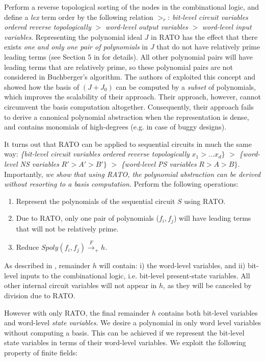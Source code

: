 Perform a reverse topological sorting of the nodes in the
combinational logic, and define a {\it lex} term order by the
following relation $>_{r}$: {\it bit-level circuit variables ordered
  reverse topologically} $>$  {\it word-level output variables} $>$
{\it word-level input   variables}. Representing the polynomial ideal
$J$ in RATO has the effect that there exists {\it one and only one
  pair of polynomials} in $J$ that do not have relatively prime
leading terms (see  Section 5 in \cite{pruss:dac14} for details). All
other polynomial pairs will have leading terms that are 
relatively prime, so these polynomial pairs are not considered in
Buchberger's algorithm.  The authors of \cite{pruss:dac14} exploited
this concept and showed how the \Grobner basis of $(J + J_0)$ can be
computed by a {\it subset} of polynomials, which  improves the
scalability of their approach. Their approach, however, cannot
circumvent the \Grobner basis computation altogether. Consequently, 
their approach fails to derive a canonical polynomial abstraction when
the representation is dense, and contains monomials of high-degrees
(e.g. in case of buggy designs). 

It turns out that RATO can be applied to sequential circuits in much
the same way: {\it \{bit-level circuit variables ordered
  reverse topologically} $x_1 > \dots x_d\}$ $>$  {\it \{word-level NS
  variables} $R'> A'> B'\}$ $>$ {\it \{word-level PS variables}
$R>A>B\}$. Importantly, {\it we show that using RATO, the polynomial
abstraction can be derived without resorting to a \Grobner basis
computation.} Perform the following operations: 

\begin{enumerate}
\item Represent the polynomials of the sequential circuit $S$ using RATO.
\item Due to RATO, only one pair of polynomials ($f_i, f_j$) will have
  leading terms that will not be relatively prime.
\item Reduce $Spoly(f_i, f_j) \xrightarrow{F}_+ h$.
\end{enumerate}
As described in \cite{pruss:dac14}, remainder $h$ will contain:
  i) the word-level variables, and ii) bit-level inputs to the
  combinational logic, i.e. bit-level present-state variables. All
  other internal circuit variables will not appear in $h$, as they
  will be canceled by division due to RATO. 

However with only RATO, the final remainder $h$ contains both bit-level variables and
word-level {\it state variables}. We desire
a polynomial in only word 
level variables without computing a
\Grobner basis. This can be achieved if we  represent the
bit-level state variables in terms of their word-level
variables. We exploit 
the following property of finite fields:

